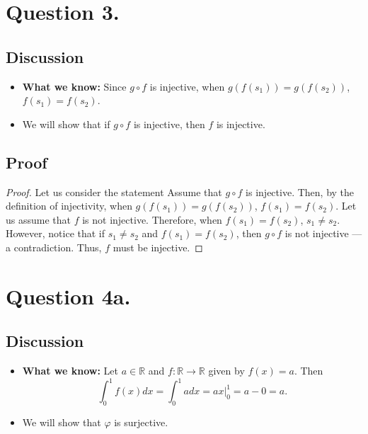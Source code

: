 \documentclass{article}
\begin{document}
\section*{Question 3.}
\subsection*{Discussion}
\begin{itemize}
    \item \textbf{What we know:} Since $ g \circ f $ is injective, when $ g(f(s_1)) = g(f(s_2)) $, $ f(s_1) = f(s_2) $.
    \item We will show that if $ g \circ f $ is injective, then $ f $ is injective.
\end{itemize}

\subsection*{Proof}
\begin{proof}
    Let us consider the statement  Assume that $ g \circ f $ is injective. Then, by the definition of injectivity, when $ g(f(s_1)) = g(f(s_2)) $, $ f(s_1) = f(s_2) $. Let us assume
    that $ f $ is not injective. Therefore, when $ f(s_1) = f(s_2) $, $ s_1 \neq s_2 $. However, notice that if $ s_1 \neq s_2 $ and $ f(s_1) = f(s_2) $, then $ g \circ f $ is not injective --- a contradiction. Thus, $ f $ must be injective.
\end{proof}

\section*{Question 4a.}
\subsection*{Discussion}
\begin{itemize}
    \item \textbf{What we know:} Let $ a \in \mathbb{R} $ and $ f : \mathbb{R} \rightarrow \mathbb{R} $ given by $ f(x) = a $. Then 
    \[
        \int_{0}^{1} f(x) dx = \int_{0}^{1} a dx = ax \Bigr|_{0}^{1} = a - 0 = a.
    \]
    \item We will show that $ \varphi $ is surjective.
\end{itemize}
\end{document}
